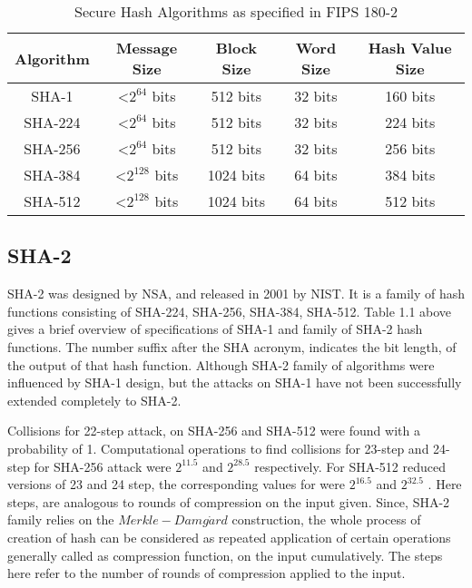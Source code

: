   \begin{table}[h]
    \begin{center}
    \begin{tabular}{ *{5}{c} }
      \hline
      Algorithm & Message Size & Block Size & Word Size & Hash Value Size \\ \hline \hline
      SHA-1   & \textless $2^{64}$  bits & 512  bits & 32 bits & 160 bits \\   
      SHA-224 & \textless $2^{64}$  bits & 512  bits & 32 bits & 224 bits \\   
      SHA-256 & \textless $2^{64}$  bits & 512  bits & 32 bits & 256 bits \\   
      SHA-384 & \textless $2^{128}$ bits & 1024 bits & 64 bits & 384 bits \\   
      SHA-512 & \textless $2^{128}$ bits & 1024 bits & 64 bits & 512 bits \\
      \hline
    \end{tabular}
    \caption{ Secure Hash Algorithms as specified in FIPS 180-2} 
  \end{center}
  \end{table}

  \subsection{SHA-2}

  SHA-2 was designed by NSA, and released in 2001 by NIST. It is a family of hash functions consisting of 
  SHA-224, SHA-256, SHA-384, SHA-512. Table 1.1 above gives a brief overview of specifications
  of SHA-1 and family of SHA-2 hash functions. The number suffix after the SHA acronym, 
  indicates the bit length, of the output of that hash function. Although SHA-2 family of algorithms
  were influenced by SHA-1 design, but the attacks on SHA-1 have not been successfully extended completely
  to SHA-2.

  Collisions for 22-step attack, on SHA-256 and SHA-512 were found with a probability of 1. Computational
  operations to find collisions for 23-step and 24-step for SHA-256 attack were $2^{11.5}$ and $2^{28.5}$ 
  respectively. For SHA-512 reduced versions of 23 and 24 step, the corresponding values for were 
  $2^{16.5}$ and $2^{32.5}$ \cite{00012}. Here steps, are analogous to rounds of compression
  on the input given. Since, SHA-2 family relies on the $Merkle-Damg\dot{a}rd$ construction, the whole
  process of creation of hash can be considered as repeated application of certain operations generally called
  as compression function, on the input cumulatively. The steps here refer to the number of rounds of
  compression applied to the input.


